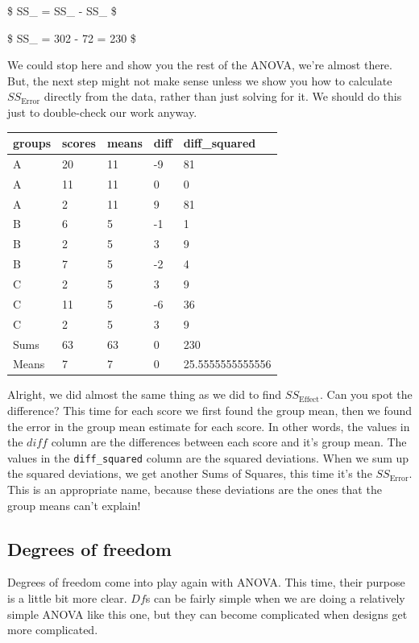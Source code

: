\documentclass[
  letterpaper,
  DIV=11,
  numbers=noendperiod]{scrreprt}
\begin{document}
\$ SS\_ = SS\_ - SS\_ \$

\$ SS\_ = 302 - 72 = 230 \$

We could stop here and show you the rest of the ANOVA, we're almost
there. But, the next step might not make sense unless we show you how to
calculate \(SS_\text{Error}\) directly from the data, rather than just
solving for it. We should do this just to double-check our work anyway.

\begin{longtable}[]{@{}lllll@{}}
\toprule\noalign{}
groups & scores & means & diff & diff\_squared \\
\midrule\noalign{}
\endhead
\bottomrule\noalign{}
\endlastfoot
A & 20 & 11 & -9 & 81 \\
A & 11 & 11 & 0 & 0 \\
A & 2 & 11 & 9 & 81 \\
B & 6 & 5 & -1 & 1 \\
B & 2 & 5 & 3 & 9 \\
B & 7 & 5 & -2 & 4 \\
C & 2 & 5 & 3 & 9 \\
C & 11 & 5 & -6 & 36 \\
C & 2 & 5 & 3 & 9 \\
Sums & 63 & 63 & 0 & 230 \\
Means & 7 & 7 & 0 & 25.5555555555556 \\
\end{longtable}

Alright, we did almost the same thing as we did to find
\(SS_\text{Effect}\). Can you spot the difference? This time for each
score we first found the group mean, then we found the error in the
group mean estimate for each score. In other words, the values in the
\(diff\) column are the differences between each score and it's group
mean. The values in the \texttt{diff\_squared} column are the squared
deviations. When we sum up the squared deviations, we get another Sums
of Squares, this time it's the \(SS_\text{Error}\). This is an
appropriate name, because these deviations are the ones that the group
means can't explain!

\subsection{Degrees of freedom}\label{degrees-of-freedom-1}

Degrees of freedom come into play again with ANOVA. This time, their
purpose is a little bit more clear. \(Df\)s can be fairly simple when we
are doing a relatively simple ANOVA like this one, but they can become
complicated when designs get more complicated.
\end{document}
